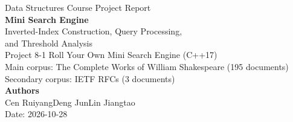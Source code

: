 \documentclass[11pt,a4paper]{article}
\newcommand{\reportsubtitle}{Inverted-Index Construction, Query Processing,\\ and Threshold Analysis}
\newcommand{\reportdate}{2026-10-28}
\newcommand{\authorA}{Cen Ruiyang}
\newcommand{\authorB}{Deng Jun}
\newcommand{\authorC}{Lin Jiangtao}
\begin{document}
\begin{titlepage}
  \thispagestyle{empty}
  \centering
  \vspace*{1.2cm}
  {\Large\sffamily Data Structures Course Project Report}\\[2.0em]
  {\Huge\bfseries Mini Search Engine}\\[0.7em]
  {\LARGE \reportsubtitle}\\[2.3em]
  {\large Project 8-1 \quad Roll Your Own Mini Search Engine (C++17)}\\[0.7em]
  {\large Main corpus: The Complete Works of William Shakespeare (195 documents)}\\
  {\large Secondary corpus: IETF RFCs (3 documents)}\\[2.7em]
  {\large\bfseries Authors}\\[0.6em]
  {\large \authorA \quad \authorB \quad \authorC}\\[2.7em]
  {\large Date: \reportdate}
  \vfill
\end{titlepage}

\begin{abstract}

\end{abstract}

\clearpage
\setcounter{tocdepth}{2}
\tableofcontents

\clearpage





\clearpage


\clearpage
\appendix



\clearpage

\end{document}
